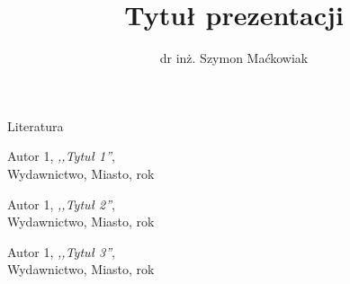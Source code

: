 \documentclass[11pt]{beamer}
\author{dr inż. Szymon Maćkowiak}
\title{\textbf{Tytuł prezentacji}}
\institute{Miejsce pracy}
\begin{document}
\begin{frame}
\titlepage
\end{frame}
\begin{frame}
\tableofcontents
\end{frame}
\begin{frame}{Literatura}
\begin{itemize}
{\tiny
\item [1] Autor 1, {\it ,,Tytuł 1''}, \\Wydawnictwo, Miasto, rok
\item [2] Autor 1, {\it ,,Tytuł 2''}, \\Wydawnictwo, Miasto, rok
\item [3] Autor 1, {\it ,,Tytuł 3''}, \\Wydawnictwo, Miasto, rok



}
\end{itemize}
\end{frame}
\end{document}
